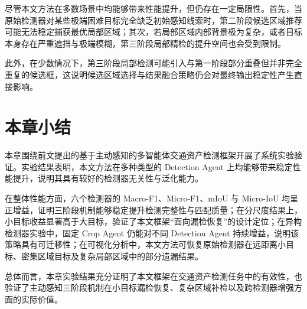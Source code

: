 尽管本文方法在多数场景中均能够带来性能提升，但仍存在一定局限性。首先，当原始检测器对某些极端困难目标完全缺乏初始感知线索时，第二阶段候选区域推荐可能无法稳定捕获最优局部区域；其次，若局部区域内部背景极为复杂，或者目标本身存在严重遮挡与极端模糊，第三阶段局部精检的提升空间也会受到限制。

此外，在少数情况下，第三阶段局部检测可能引入与第一阶段部分重叠但并非完全重复的候选框，这说明候选区域选择与结果融合策略仍会对最终输出稳定性产生直接影响。


\section{本章小结}
\label{sec:exp_summary}

本章围绕前文提出的基于主动感知的多智能体交通资产检测框架开展了系统实验验证。实验结果表明，本文方法在多种类型的 Detection Agent 上均能够带来稳定性能提升，说明其具有较好的检测器无关性与泛化能力。

在整体性能方面，六个检测器的 Macro-F1、Micro-F1、mIoU 与 Micro-IoU 均呈正增益，证明三阶段机制能够稳定提升检测完整性与匹配质量；在分尺度结果上，小目标收益显著高于大目标，验证了本文框架“面向漏检恢复”的设计定位；在异构检测器实验中，固定 Crop Agent 仍能对不同 Detection Agent 持续增益，说明该策略具有可迁移性；在可视化分析中，本文方法可恢复原始检测器在远距离小目标、密集区域目标及复杂局部区域中的部分遗漏结果。

总体而言，本章实验结果充分证明了本文框架在交通资产检测任务中的有效性，也验证了主动感知三阶段机制在小目标漏检恢复、复杂区域补检以及跨检测器增强方面的实际价值。
